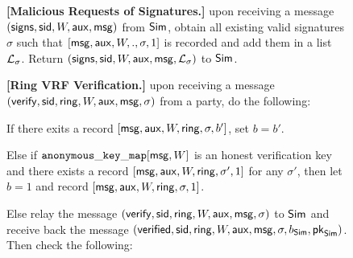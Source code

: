 \begin{figure}
\begin{tcolorbox}[left=2pt,right=2pt]
{			\textbf{[Malicious Requests of  Signatures.]} upon receiving a message $ (\mathsf{signs}, \textsf{sid}, W, \mathsf{aux},\mathsf{msg}) $ from $ \mathsf{Sim} $, obtain all existing valid signatures $ \sigma $ such that $ [\mathsf{msg}, \mathsf{aux},W,.,\sigma, 1] $ is recorded and add them in a list $ {\mathcal{L}}_{\sigma} $. 	Return $ (\mathsf{signs}, \textsf{sid}, W,\mathsf{aux},\mathsf{msg}, {\mathcal{L}}_{\sigma})  $ to $ \mathsf{Sim} $.
			
			\textbf{[Ring VRF Verification.]} upon receiving a message $(\mathsf{verify}, \textsf{sid}, \mathsf{ring},W, \mathsf{aux}, \mathsf{msg}, \sigma)$ from a party, do the following: 
				
				\begin{list}{\hspace*{1pt} C}{\setlength\leftmargin{0.15in}}
					\item If there exits a record $ [\mathsf{msg},\mathsf{aux},W,\mathsf{ring},\sigma, b'] $, set $ b = b' $. 
					
					\label{cond:consistency}
					\item Else if $ \mathtt{anonymous\_key\_map}[\mathsf{msg},W]  $ is an honest verification key and  there exists a record $ [\mathsf{msg},\mathsf{aux}, W,\mathsf{ring}, \sigma', 1] $ for any $ \sigma' $, then let $ b=1 $ and record $ [\mathsf{msg},\mathsf{aux}, W,\mathsf{ring},\sigma, 1] $. 
					\label{cond:differentsignature}
					
					\item \label{cond:malicioussignature}Else relay the message $(\mathsf{verify}, \textsf{sid}, \mathsf{ring},W,\mathsf{aux}, \mathsf{msg}, \sigma)$ to $ \mathsf{Sim} $ and receive back the message $(\mathsf{verified}, \textsf{sid}, \mathsf{ring},W,\mathsf{aux}, \mathsf{msg}, \sigma, b_{\mathsf{Sim}}, \mathsf{pk}_{\mathsf{Sim}})$.  Then check the following:
					

\end{list}}
\end{tcolorbox}
\end{figure}
